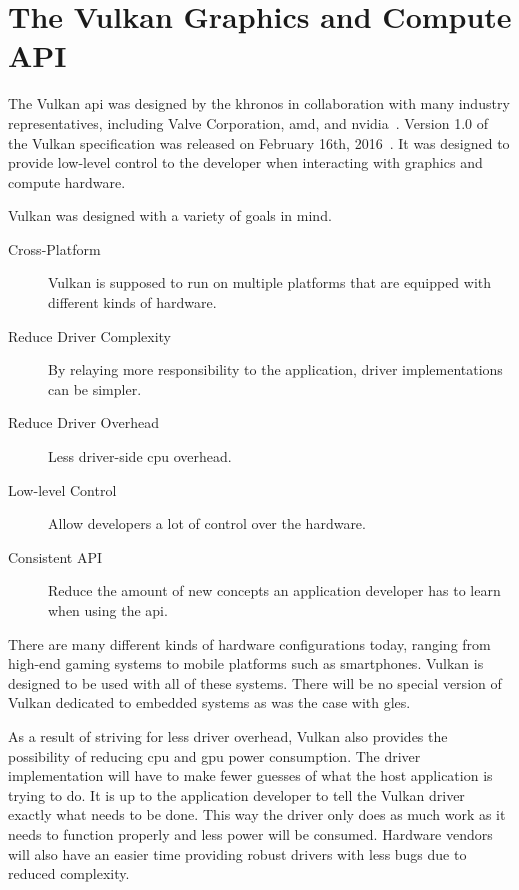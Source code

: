 


  \section{The Vulkan Graphics and Compute API}
    The Vulkan \gls{api} was designed by the \gls{khronos} in collaboration with many industry representatives, including Valve Corporation, \gls{amd}, and \gls{nvidia}~\cite{vkspec}.
    Version 1.0 of the Vulkan specification was released on February 16th, 2016~\cite{vkrelease1dot0}.
    It was designed to provide low-level control to the developer when interacting with graphics and compute hardware.

    Vulkan was designed with a variety of goals in mind.

    \begin{description}
      \item[Cross-Platform] Vulkan is supposed to run on multiple platforms that are equipped with different kinds of hardware.
      \item[Reduce Driver Complexity] By relaying more responsibility to the application, driver implementations can be simpler.
      \item[Reduce Driver Overhead] Less driver-side \gls{cpu} overhead.
      \item[Low-level Control] Allow developers a lot of control over the hardware.
      \item[Consistent API] Reduce the amount of new concepts an application developer has to learn when using the \gls{api}.
    \end{description}

    There are many different kinds of hardware configurations today, ranging from high-end gaming systems to mobile platforms such as smartphones.
    Vulkan is designed to be used with all of these systems.
    There will be no special version of Vulkan dedicated to embedded systems as was the case with \gls{gles}.

    As a result of striving for less driver overhead, Vulkan also provides the possibility of reducing \gls{cpu} and \gls{gpu} power consumption.
    The driver implementation will have to make fewer guesses of what the host application is trying to do.
    It is up to the application developer to tell the Vulkan driver exactly what needs to be done.
    This way the driver only does as much work as it needs to function properly and less power will be consumed.
    Hardware vendors will also have an easier time providing robust drivers with less bugs due to reduced complexity.

